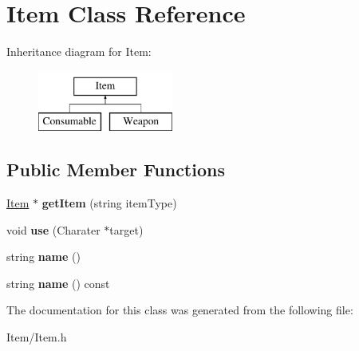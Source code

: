 \hypertarget{classItem}{\section{Item Class Reference}
\label{classItem}
}
Inheritance diagram for Item\-:\begin{figure}[H]
\begin{center}
\leavevmode
\includegraphics[height=2.000000cm]{classItem}
\end{center}
\end{figure}
\subsection*{Public Member Functions}
\begin{DoxyCompactItemize}
\item 
\hypertarget{classItem_ae2398e06c05c81df420d4ce92cd69a80}{\hyperlink{classItem}{Item} $\ast$ {\bfseries get\-Item} (string item\-Type)}\label{classItem_ae2398e06c05c81df420d4ce92cd69a80}

\item 
\hypertarget{classItem_a288f11fb8e6a7689e76d9b35baff47a6}{void {\bfseries use} (Charater $\ast$target)}\label{classItem_a288f11fb8e6a7689e76d9b35baff47a6}

\item 
\hypertarget{classItem_aec2f225f58b466627cb268d8f67b6c2f}{string {\bfseries name} ()}\label{classItem_aec2f225f58b466627cb268d8f67b6c2f}

\item 
\hypertarget{classItem_aefdaa767e00c0fcfe2801a5e3e4e951d}{string {\bfseries name} () const }\label{classItem_aefdaa767e00c0fcfe2801a5e3e4e951d}

\end{DoxyCompactItemize}


The documentation for this class was generated from the following file\-:\begin{DoxyCompactItemize}
\item 
Item/Item.\-h\end{DoxyCompactItemize}
